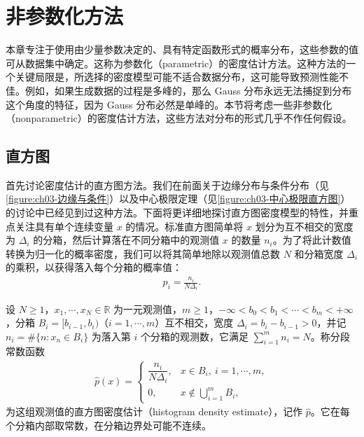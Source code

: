 \documentclass[../../main.tex]{subfiles}
\begin{document}
\section{非参数化方法}\label{section:ch03-非参数化方法}

本章专注于使用由少量参数决定的、具有特定函数形式的概率分布，这些参数的值可从数据集中确定。这称为参数化（parametric）的密度估计方法。这种方法的一个关键局限是，所选择的密度模型可能不适合数据分布，这可能导致预测性能不佳。例如，如果生成数据的过程是多峰的，那么 Gauss 分布永远无法捕捉到分布这个角度的特征，因为 Gauss 分布必然是单峰的。本节将考虑一些非参数化（nonparametric）的密度估计方法，这些方法对分布的形式几乎不作任何假设。

\subsection{直方图}\label{subsection:ch03-直方图}

首先讨论密度估计的直方图方法。我们在前面关于边缘分布与条件分布（见\cref{figure:ch03-边缘与条件}）以及中心极限定理（见\cref{figure:ch03-中心极限直方图}）的讨论中已经见到过这种方法。下面将更详细地探讨直方图密度模型的特性，并重点关注具有单个连续变量 $x$ 的情况。标准直方图简单将 $x$ 划分为互不相交的宽度为 $\Delta_i$ 的分箱，然后计算落在不同分箱中的观测值 $x$ 的数量 $n_i$。为了将此计数值转换为归一化的概率密度，我们可以将其简单地除以观测值总数 $N$ 和分箱宽度 $\Delta_i$ 的乘积，以获得落入每个分箱的概率值：
\begin{align}
p_i=\frac{n_i}{N\Delta_i}.
\label{align:ch03-直方图密度}
\end{align}

\begin{definition}[直方图密度估计]\label{definition:ch03-直方图}
设 $N\geqslant1$，$x_1,\cdots,x_N\in\mathbb{R}$ 为一元观测值，$m\geqslant1$，$-\infty<b_0<b_1<\cdots<b_m<+\infty$，分箱 $B_i=[b_{i-1},b_i)$（$i=1,\cdots,m$）互不相交，宽度 $\Delta_i=b_i-b_{i-1}>0$，并记 $n_i=\#\{n:x_n\in B_i\}$ 为落入第 $i$ 个分箱的观测数，它满足 $\sum_{i=1}^{m}n_i=N$。称分段常数函数
\begin{align*}
\hat{p}(x)=\begin{cases}\dfrac{n_i}{N\Delta_i}, & x\in B_i,\ i=1,\cdots,m,\\[2pt] 0, & x\notin\bigcup_{i=1}^{m}B_i,\end{cases}
\end{align*}
为这组观测值的直方图密度估计（histogram density estimate），记作 $\hat{p}$。它在每个分箱内部取常数，在分箱边界处可能不连续。
\end{definition}
\end{document}
